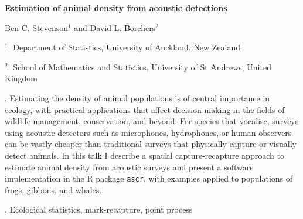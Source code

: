 \documentclass[12pt]{article}
\begin{document}
\begin{flushleft}


{\LARGE\bf Estimation of animal density from acoustic detections}


\vspace{1.0cm}

Ben C. Stevenson$^1$ and David L. Borchers$^2$

\begin{description}

\item $^1 \;$ Department of Statistics, University of Auckland, New Zealand

\item $^2 \;$ School of Mathematics and Statistics, University of St Andrews, United Kingdom

\end{description}

\end{flushleft}


\vspace{0.75cm}

. Estimating the density of animal populations
is of central importance in ecology, with practical applications that
affect decision making in the fields of wildlife management,
conservation, and beyond. For species that vocalise, surveys using
acoustic detectors such as microphones, hydrophones, or human
observers can be vastly cheaper than traditional surveys that
physically capture or visually detect animals. In this talk I describe
a spatial capture-recapture approach to estimate animal density from
acoustic surveys and present a software implementation in the R
package \texttt{ascr}, with examples applied to populations of frogs,
gibbons, and whales.

\vskip 2mm

. Ecological statistics, mark-recapture, point
process
\end{document}
